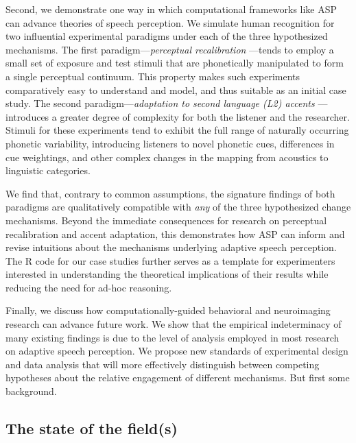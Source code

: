 \documentclass[
  11pt,
  man,floatsintext]{apa6}
\begin{document}
Second, we demonstrate one way in which computational frameworks like ASP can advance theories of speech perception. We simulate human recognition for two influential experimental paradigms under each of the three hypothesized mechanisms. The first paradigm---\emph{perceptual recalibration} \autocites[e.g.,][]{kraljic-samuel2006,reinisch-holt2013,samuel2016,vroomen-baart2009}---tends to employ a small set of exposure and test stimuli that are phonetically manipulated to form a single perceptual continuum. This property makes such experiments comparatively easy to understand and model, and thus suitable as an initial case study. The second paradigm---\emph{adaptation to second language (L2) accents} \autocites[e.g.,][]{bradlow-bent2008,hernandez2019,tzeng2016,sidaras2009,xie2016jep,zheng-samuel2020}---introduces a greater degree of complexity for both the listener and the researcher. Stimuli for these experiments tend to exhibit the full range of naturally occurring phonetic variability, introducing listeners to novel phonetic cues, differences in cue weightings, and other complex changes in the mapping from acoustics to linguistic categories.

We find that, contrary to common assumptions, the signature findings of both paradigms are qualitatively compatible with \emph{any} of the three hypothesized change mechanisms. Beyond the immediate consequences for research on perceptual recalibration and accent adaptation, this demonstrates how ASP can inform and revise intuitions about the mechanisms underlying adaptive speech perception. The R code for our case studies further serves as a template for experimenters interested in understanding the theoretical implications of their results while reducing the need for ad-hoc reasoning.

Finally, we discuss how computationally-guided behavioral and neuroimaging research can advance future work. We show that the empirical indeterminacy of many existing findings is due to the level of analysis employed in most research on adaptive speech perception. We propose new standards of experimental design and data analysis that will more effectively distinguish between competing hypotheses about the relative engagement of different mechanisms. But first some background.

\subsection{The state of the field(s)}\label{the-state-of-the-fields}
\end{document}
